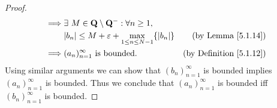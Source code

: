 \begin{proof}
\begin{align*}
        \implies & \exists\ M \in \mathbf{Q} \setminus \mathbf{Q}^- : \forall n \geq 1,                                                                                      \\
                 & \abs*{b_n} \leq M + \varepsilon + \max_{1 \leq n \leq N - 1}\{\abs*{b_n}\}                                    & \text{(by Lemma \ref{5.1.14})}            \\
        \implies & (a_n)_{n = 1}^\infty \text{ is bounded}.                                                                      & \text{(by Definition \ref{5.1.12})}
    \end{align*}
    Using similar arguments we can show that \((b_n)_{n = 1}^\infty\) is bounded implies \((a_n)_{n = 1}^\infty\) is bounded.
    Thus we conclude that \((a_n)_{n = 1}^\infty\) is bounded iff \((b_n)_{n = 1}^\infty\) is bounded.
\end{proof}
